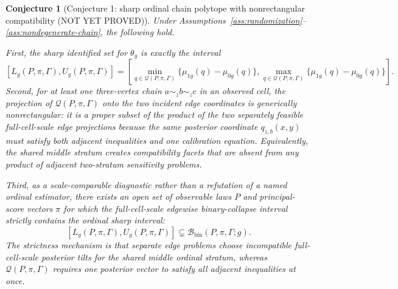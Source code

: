\documentclass[11pt]{article}
\theoremstyle{definition}
\theoremstyle{plain}
\newtheorem{conjecture}{Conjecture}
\theoremstyle{remark}
\begin{document}
\begin{conjecture}[Conjecture 1: sharp ordinal chain polytope with nonrectangular compatibility (NOT YET PROVED)]\label{conj:ordinal-chain-sharpness}
Under Assumptions~\ref{ass:randomization}--\ref{ass:nondegenerate-chain}, the following hold.

First, the sharp identified set for \(\theta_g\) is exactly the interval
\[
  [L_g(P,\pi,\Gamma),U_g(P,\pi,\Gamma)]
  =
  \left[
  \min_{q\in\mathcal Q(P,\pi,\Gamma)}\{\mu_{1g}(q)-\mu_{0g}(q)\},
  \max_{q\in\mathcal Q(P,\pi,\Gamma)}\{\mu_{1g}(q)-\mu_{0g}(q)\}
  \right].
\]
Second, for at least one three-vertex chain \(a\sim_z b\sim_z c\) in an observed cell, the projection of \(\mathcal Q(P,\pi,\Gamma)\) onto the two incident edge coordinates is generically nonrectangular: it is a proper subset of the product of the two separately feasible full-cell-scale edge projections because the same posterior coordinate \(q_{z,b}(x,y)\) must satisfy both adjacent inequalities and one calibration equation.  Equivalently, the shared middle stratum creates compatibility facets that are absent from any product of adjacent two-stratum sensitivity problems.

Third, as a scale-comparable diagnostic rather than a refutation of a named ordinal estimator, there exists an open set of observable laws \(P\) and principal-score vectors \(\pi\) for which the full-cell-scale edgewise binary-collapse interval strictly contains the ordinal sharp interval:
\[
  [L_g(P,\pi,\Gamma),U_g(P,\pi,\Gamma)]
  \subsetneq
  \mathcal B_{\mathrm{bin}}(P,\pi,\Gamma;g).
\]
The strictness mechanism is that separate edge problems choose incompatible full-cell-scale posterior tilts for the shared middle ordinal stratum, whereas \(\mathcal Q(P,\pi,\Gamma)\) requires one posterior vector to satisfy all adjacent inequalities at once.
\end{conjecture}
\end{document}
